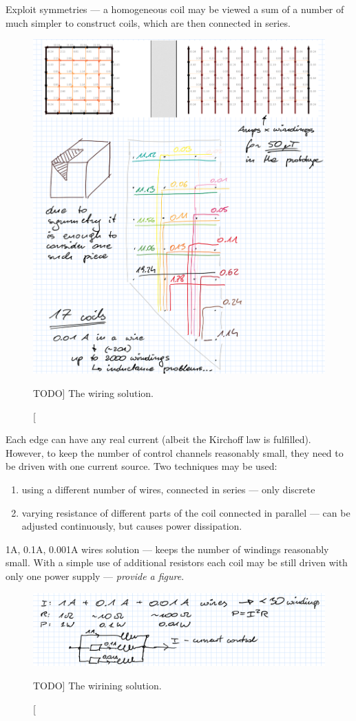 Exploit symmetries --- a homogeneous coil may be viewed a sum of a number of
much simpler to construct coils, which are then connected in series.

\begin{figure}[bth]
  \myfloatalign
  \includegraphics[width=.6\linewidth]{gfx/coils/wiring}
  \caption
  [TODO]
  {%
The wiring solution.}
  \label{fig:coils_wiring}
\end{figure}

Each edge can have any real current (albeit the Kirchoff law is fulfilled).
However, to keep the number of control channels reasonably small, they need
to be driven with one current source. Two techniques may be used:
\begin{enumerate}
  \item using a different number of wires, connected in series --- only discrete
  \item varying resistance of different parts of the coil connected in parallel
  --- can be adjusted continuously, but causes power dissipation.
\end{enumerate}

1A, 0.1A, 0.001A wires solution --- keeps the number of windings reasonably small.
With a simple use of additional resistors each coil may be still driven with only
one power supply --- \emph{provide a figure}.

\begin{figure}[bth]
  \myfloatalign
  \includegraphics[width=.6\linewidth]{gfx/coils/current_discretisation}
  \caption
  [TODO]
  {%
The wirining solution.}
  \label{fig:coils_current_discretisation}
\end{figure}

